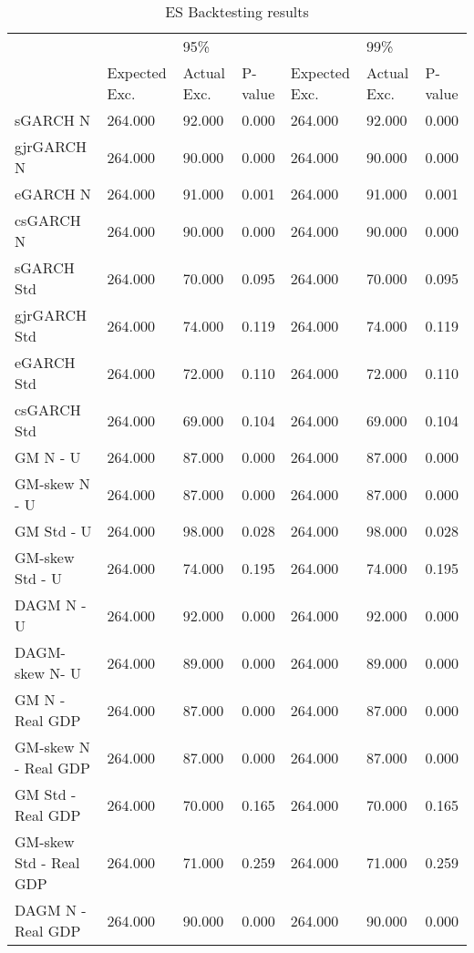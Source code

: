 \documentclass{article}
\begin{document}


\begin{table}[ht] \small
\centering
\caption {\small ES Backtesting results}
\begin{tabular}{|l|lll|lll|}

\hline
& & 95\% & & & 99\% & \\
 & Expected Exc. & Actual Exc. & P-value & Expected Exc. & Actual Exc.  & P-value \\ 
\hline
sGARCH N & 264.000 & 92.000 & 0.000  & 264.000 & 92.000 & 0.000 \\ 
gjrGARCH N & 264.000 & 90.000 & 0.000  & 264.000 & 90.000 & 0.000 \\
eGARCH N & 264.000 & 91.000 & 0.001 & 264.000 & 91.000 & 0.001 \\ 
csGARCH N & 264.000 & 90.000 & 0.000  & 264.000 & 90.000 & 0.000 \\ 
sGARCH Std & 264.000 & 70.000 & 0.095  & 264.000 & 70.000 & 0.095 \\ 
gjrGARCH Std & 264.000 & 74.000 & 0.119  & 264.000 & 74.000 & 0.119 \\ 
eGARCH Std & 264.000 & 72.000 & 0.110 & 264.000 & 72.000 & 0.110 \\
csGARCH Std & 264.000 & 69.000 & 0.104  & 264.000 & 69.000 & 0.104 \\ 
GM N - U & 264.000 & 87.000 & 0.000  & 264.000 & 87.000 & 0.000 \\
GM-skew N - U & 264.000 & 87.000 & 0.000  & 264.000 & 87.000 & 0.000 \\ 
GM Std - U & 264.000 & 98.000 & 0.028  & 264.000 & 98.000 & 0.028 \\ 
GM-skew Std - U & 264.000 & 74.000 & 0.195  & 264.000 & 74.000 & 0.195 \\ 
DAGM N - U & 264.000 & 92.000 & 0.000 & 264.000 & 92.000 & 0.000 \\ 
DAGM-skew  N- U & 264.000 & 89.000 & 0.000 & 264.000 & 89.000 & 0.000 \\ 
GM N - Real GDP & 264.000 & 87.000 & 0.000  & 264.000 & 87.000 & 0.000 \\ 
GM-skew N - Real GDP & 264.000 & 87.000 & 0.000  & 264.000 & 87.000 & 0.000 \\ 
GM Std - Real GDP & 264.000 & 70.000 & 0.165  & 264.000 & 70.000 & 0.165 \\
GM-skew Std - Real GDP & 264.000 & 71.000 & 0.259 & 264.000 & 71.000 & 0.259 \\
DAGM N - Real GDP & 264.000 & 90.000 & 0.000  & 264.000 & 90.000 & 0.000 \\ 

\end{tabular}
\end{table}
\end{document}
